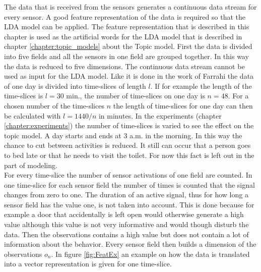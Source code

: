 The data that is received from the sensors generates a continuous data stream for every sensor. A good feature representation of the data is required so that the LDA model can be applied. The feature representation that is described in this chapter is used as the artificial words for the LDA model that is described in chapter \ref{chapter:topic_models} about the Topic model.
First the data is divided into five fields and all the sensors in one field are grouped together. In this way the data is reduced to five dimensions. 
The continuous data stream cannot be used as input for the LDA model. Like it is done in the work of Farrahi \cite{farrahi2008daily} the data of one day is divided into time-slices of length $l$. If for example the length of the time-slices is $l=30$ min., the number of time-slices on one day is $n=48$. For a chosen number of the time-slices $n$ the length of time-slices for one day can then be calculated with $l=1440/n$ in minutes. In the experiments (chapter \ref{chapter:experiments}) the number of time-slices is varied to see the effect on the topic model.
A day starts and ends at 3 a.m. in the morning. In this way the chance to cut between activities is reduced. It still can occur that a person goes to bed late or that he needs to visit the toilet. For now this fact is left out in the part of modeling.\\

For every time-slice the number of sensor activations of one field are counted. In one time-slice for each sensor field the number of times is counted that the signal changes from zero to one. The duration of an active signal, thus for how long a sensor field has the value one, is not taken into account. This is done because for example a door that accidentally is left open would otherwise generate a high value although this value is not very informative and would though disturb the data. Then the observations contains a high value but does not contain a lot of information about the behavior.
Every sensor field then builds a dimension of the observations $o_n$. In figure \ref{fig:FeatEx} an example on how the data is translated into a vector representation is given for one time-slice.

